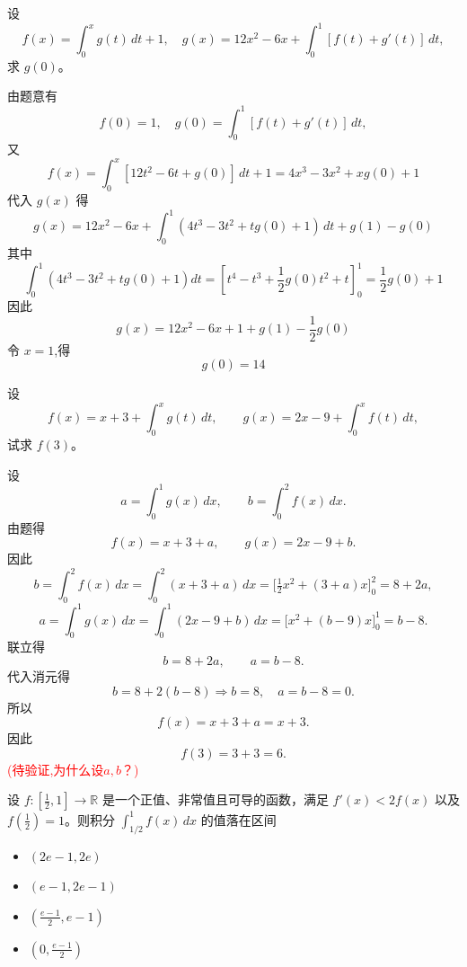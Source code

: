 \begin{questions}
    \question 设 
    \[
    f(x)=\int_{0}^{x} g(t) \, dt + 1, \quad g(x) = 12x^{2} - 6x + \int_{0}^{1} [f(t) + g'(t)] \, dt,
    \]
    求 $g(0)$。
    \begin{solution}
        由题意有
        \[
        f(0) = 1,\quad g(0) = \int_0^1 [f(t) + g'(t)] \, dt,
        \]
        又
        \[
        f(x) = \int_0^x [12t^{2} - 6t + g(0)] \, dt + 1 = 4x^{3} - 3x^{2} + x g(0) + 1
        \]
        代入 $g(x)$ 得
        \[
        g(x) = 12x^{2} - 6x + \int_0^1 (4t^{3} - 3t^{2} + t g(0) + 1) \, dt + g(1) - g(0)
        \]
        其中
        \[
        \int_0^1 (4t^{3} - 3t^{2} + t g(0) + 1) dt = \left[ t^{4} - t^{3} + \frac{1}{2} g(0) t^{2} + t \right]_0^1 = \frac{1}{2} g(0) + 1
        \]
        因此
        \[
        g(x) = 12x^{2} - 6x + 1 + g(1) - \frac{1}{2} g(0)
        \]
        令 $x=1$,得
        \[
        g(0) = 14
        \]
    \end{solution}

\question 设
\[
f(x)=x+3+\int_{0}^{x}g(t)\,dt,\qquad
g(x)=2x-9+\int_{0}^{x}f(t)\,dt,
\]
试求 $f(3)$。
\begin{solution}
设
\[
a=\int_0^1 g(x)\,dx,\qquad b=\int_0^2 f(x)\,dx.
\]
由题得
\[
f(x)=x+3+a,\qquad g(x)=2x-9+b.
\]
因此
\[
b=\int_0^2 f(x)\,dx=\int_0^2 (x+3+a)\,dx
=\Big[\tfrac{1}{2}x^2+(3+a)x\Big]_0^2=8+2a,
\]
\[
a=\int_0^1 g(x)\,dx=\int_0^1 (2x-9+b)\,dx
=\Big[x^2+(b-9)x\Big]_0^1=b-8.
\]
联立得
\[
b=8+2a,\qquad a=b-8.
\]
代入消元得
\[
b=8+2(b-8)\Rightarrow b=8,\quad a=b-8=0.
\]
所以
\[
f(x)=x+3+a=x+3.
\]
因此
\[
f(3)=3+3=6.
\]
\textcolor{red}{(待验证,为什么设$a,b$？)}
\end{solution}

\question 设 $f: \left[ \frac{1}{2}, 1 \right] \to \mathbb{R}$ 是一个正值、非常值且可导的函数，满足 $f'(x) < 2f(x)$ 以及 $f\left( \frac{1}{2} \right) = 1$。则积分 $\int_{1/2}^{1} f(x) \,dx$ 的值落在区间

\begin{itemize}
    \item[(A)] $(2e - 1, 2e)$
    \item[(B)] $(e - 1, 2e - 1)$
    \item[(C)] $\left( \frac{e - 1}{2}, e - 1 \right)$
    \item[(D)] $\left( 0, \frac{e - 1}{2} \right)$
\end{itemize}


\end{questions}
